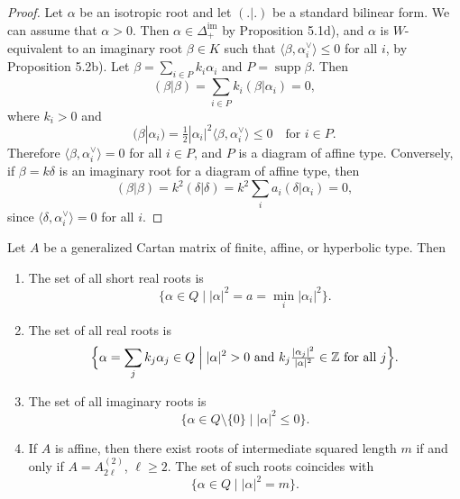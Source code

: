 \documentclass[12pt]{article}
\begin{document}
\begin{proof}
    Let $\alpha$ be an isotropic root and let $(.|.)$ be a standard bilinear form.
    We can assume that $\alpha>0$. Then $\alpha \in \Delta^{\mathrm{im}}_+$ by
    Proposition 5.1d), and $\alpha$ is $W$-equivalent to an imaginary root
    $\beta \in K$ such that $\langle \beta,\alpha_i^\vee\rangle \leq 0$ for all $i$,
    by Proposition 5.2b). Let $\beta = \sum_{i\in P} k_i\alpha_i$ and
    $P=\operatorname{supp}\beta$. Then
    \[
        (\beta|\beta) = \sum_{i\in P} k_i(\beta|\alpha_i) = 0,
    \]
    where $k_i>0$ and
    \[
        (\beta|\alpha_i) = \tfrac{1}{2}|\alpha_i|^2 \langle \beta,\alpha_i^\vee \rangle
        \leq 0 \quad \text{for } i\in P.
    \]
    Therefore $\langle \beta,\alpha_i^\vee\rangle = 0$ for all $i\in P$, and $P$ is a
    diagram of affine type. Conversely, if $\beta = k\delta$ is an imaginary root for a
    diagram of affine type, then
    \[
        (\beta|\beta) = k^2(\delta|\delta) = k^2 \sum_i a_i(\delta|\alpha_i) = 0,
    \]
    since $\langle \delta,\alpha_i^\vee\rangle=0$ for all $i$.
\end{proof}

\begin{proposition}\label{prop:root-lengths}
    Let $A$ be a generalized Cartan matrix of finite, affine, or hyperbolic type. Then

    \begin{enumerate}[label=\alph*)]

        \item The set of all short real roots is
              \[
                  \{\alpha \in Q \mid |\alpha|^2 = a = \min_i |\alpha_i|^2 \}.
              \]

        \item The set of all real roots is
              \[
                  \Bigl\{\alpha = \sum_j k_j \alpha_j \in Q \;\Big|\;
                  |\alpha|^2 > 0 \ \text{and}\ k_j \tfrac{|\alpha_j|^2}{|\alpha|^2} \in \mathbb{Z}\
                  \text{for all $j$} \Bigr\}.
              \]

        \item The set of all imaginary roots is
              \[
                  \{\alpha \in Q\setminus\{0\} \mid |\alpha|^2 \leq 0 \}.
              \]

        \item If $A$ is affine, then there exist roots of intermediate squared length $m$ if and only if
              $A = A_{2\ell}^{(2)}$, $\ell \geq 2$. The set of such roots coincides with
              \[
                  \{\alpha \in Q \mid |\alpha|^2 = m \}.
              \]
    \end{enumerate}
\end{proposition}
\end{document}
